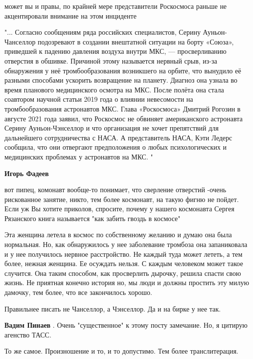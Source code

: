 \begin{itemize}
\begin{itemize}
может вы и правы, по крайней мере представители Роскосмоса раньше не
акцентировали внимание на этом инциденте

"... Согласно сообщениям ряда российских специалистов, Серину Ауньон-Чанселлор
подозревают в создании внештатной ситуации на борту «Союза», приведшей к
падению давления воздуха внутри МКС, — просверливанию отверстия в обшивке.
Причиной этому называется нервный срыв, из-за обнаружения у неё
тромбообразования возникшего на орбите, что вынудило её разными способами
ускорить возвращение на планету. Диагноз она узнала во время планового
медицинского осмотра на МКС. После полёта она стала соавтором научной статьи
2019 года о влиянии невесомости на тромбообразования астронавтов МКС. Глава
«Роскосмоса» Дмитрий Рогозин в августе 2021 года заявил, что Роскосмос не
обвиняет американского астронавта Серину Ауньон-Чэнселлор и что организация не
хочет препятствий для дальнейшего сотрудничества с НАСА. А представитель НАСА,
Кэти Ледерс сообщила, что они отвергают предположения о любых психологических и
медицинских проблемах у астронавтов на МКС. "

\textbf{Игорь Фадеев} 

вот пипец, комонавт вообще-то понимает, что сверление отверстий -очень
рискованное занятие, никто, тем более космонавт, на такую фигню не пойдет. Если
уж Вы хотите приколов, спросите, почему у нашего космонавта Сергея Рязанского
книга называется "как забить гвоздь в космосе"



Эта женщина летела в космос по собственному желанию и думаю она была
нормальная. Но, как обнаружилось у нее заболевание тромбоза она запаниковала и
у нее получилось нервное расстройство. Не каждый туда может лететь, а тем
более, нежная женщина. Ее осуждать нельзя. С каждым человеком может такое
случится. Она таким способом, как просверлить дырочку, решила спасти свою
жизнь. Не приятная конечно история но, мы люди и должны простить эту милую
дамочку, тем более, что все закончилось хорошо.

\end{itemize} %

Правильнее писать не Чанселлор, а Чэнселлор. Да и на бирке у нее так.

\begin{itemize} %
\textbf{Вадим Пинаев} . Очень "существенное" к этому посту замечание. Но, я цитирую агенство ТАСС.

То же самое. Произношение и то, и то допустимо. Тем более транслитерация.


\end{itemize}
\end{itemize}

